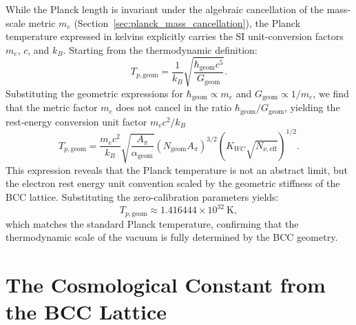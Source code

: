\documentclass[10pt,a4paper]{article}
\begin{document}
While the Planck length is invariant under the algebraic cancellation of the mass-scale metric \(m_e\) (Section~\ref{sec:planck_mass_cancellation}), the Planck temperature expressed in kelvins explicitly carries the SI unit-conversion factors \(m_e\), \(c\), and \(k_B\). Starting from the thermodynamic definition:
\begin{equation}
	T_{p,\text{geom}} = \frac{1}{k_B} \sqrt{\frac{\hbar_{\text{geom}} c^5}{G_{\text{geom}}}}.
	\label{eq:Tp_def}
\end{equation}
Substituting the geometric expressions for \(\hbar_{\text{geom}} \propto m_e\) and \(G_{\text{geom}} \propto 1/m_e\), we find that the metric factor \(m_e\) does not cancel in the ratio \(\hbar_{\text{geom}}/G_{\text{geom}}\), yielding the rest-energy conversion unit factor \(m_e c^2 / k_B\)
\begin{equation}
	T_{p,\text{geom}} = \frac{m_e c^2}{k_B} \sqrt{\frac{A_\pi}{\alpha_{\text{geom}}}} \left(N_{\text{geom}} A_\pi\right)^{3/2} \left( K_{WC} \sqrt{N_{\nu,\text{eff}}} \right)^{1/2}.
	\label{eq:Tp_geom}
\end{equation}
This expression reveals that the Planck temperature is not an abstract limit, but the electron rest energy unit convention scaled by the geometric stiffness of the BCC lattice. Substituting the zero-calibration parameters yields:
\begin{equation}
	T_{p,\text{geom}} \approx 1.416444 \times 10^{32}\ \text{K},
\end{equation}
which matches the standard Planck temperature, confirming that the thermodynamic scale of the vacuum is fully determined by the BCC geometry.


\section{The Cosmological Constant from the BCC Lattice}
\label{sec:cosmo_summary}
\end{document}
